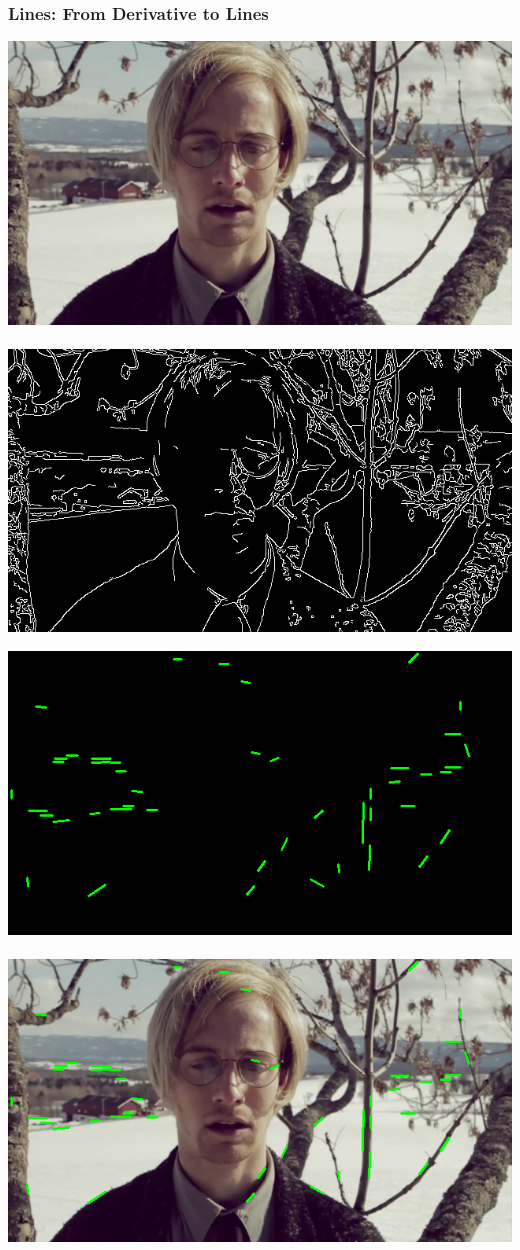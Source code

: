 \documentclass{beamer}
\begin{document}
	\begin{frame}
	\frametitle{Lines: From Derivative to Lines}
		
		\includegraphics[scale = 0.26]{stuckFrame200}~
		\includegraphics[scale = 0.26]{stuckFrame200D}\newline
		
		\includegraphics[scale = 0.26]{stuckFrame200L}~
		\includegraphics[scale = 0.26]{stuckFrame200O}~
		
	\end{frame}
	
\end{document}
